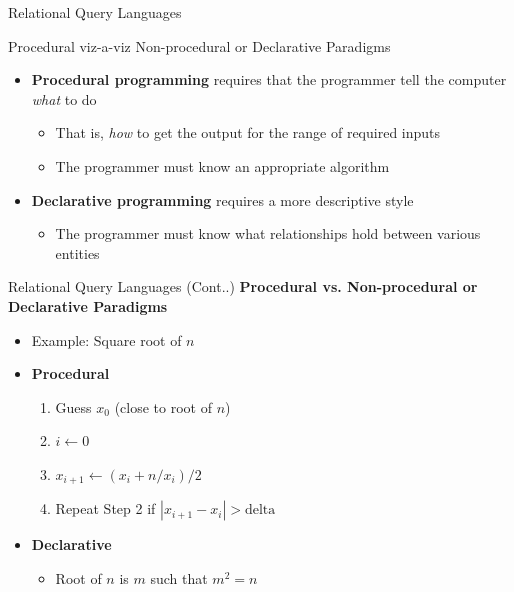 \documentclass[aspectratio=169, xcolor=dvipsnames]{beamer}
\begin{document}
\begin{frame}{Relational Query Languages}
    \begin{block}{Procedural viz-a-viz Non-procedural or Declarative Paradigms}
        \begin{itemize}[<+->]
            \item \textbf{Procedural programming} requires that the programmer tell the computer \textit{what} to do
            \begin{itemize}
                \item That is, \textit{how} to get the output for the range of required inputs
                \item The programmer must know an appropriate algorithm
            \end{itemize}
            \item \textbf{Declarative programming} requires a more descriptive style
            \begin{itemize}
                \item The programmer must know what relationships hold between various entities
            \end{itemize}
        \end{itemize}
    \end{block}
\end{frame}

\begin{frame}{Relational Query Languages (Cont..)}
    \textbf{Procedural vs. Non-procedural or Declarative Paradigms}
    \begin{itemize}
        \item Example: Square root of $n$
        \item \textbf{Procedural}
        \begin{enumerate}
            \item[a)] Guess $x_0$ (close to root of $n$)
            \item[b)] $i \leftarrow 0$
            \item[c)] $x_{i+1} \leftarrow (x_i + n / x_i) / 2$
            \item[d)] Repeat Step 2 if $|x_{i+1} - x_i| > \text{delta}$
        \end{enumerate}
        \item \textbf{Declarative}
        \begin{itemize}
            \item[$\triangleright$] Root of $n$ is $m$ such that $m^2 = n$
        \end{itemize}
    \end{itemize}
\end{frame}
\end{document}
